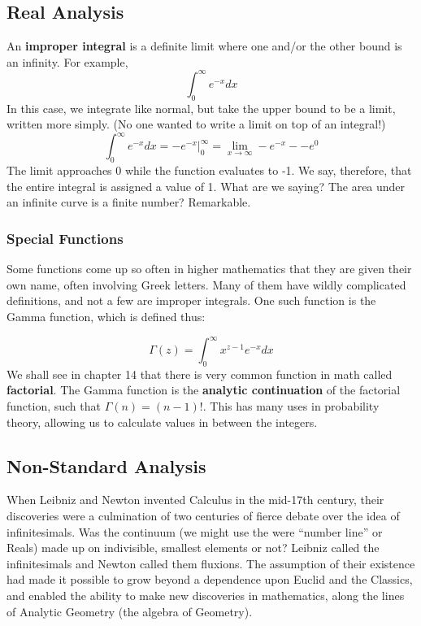 
\subsection{Real Analysis}



An \textbf{improper integral} is a definite limit where one and/or the other bound is
an infinity.  For example, 
$$
\int_0^\infty e^{-x}dx
$$
In this case, we integrate like normal, but take the upper bound to be a limit, 
written more simply.  (No one wanted to write a limit on top of an integral!)  
$$
\int_0^\infty e^{-x}dx = \left.-e^{-x}\right|_0^\infty = \lim_{x\rightarrow\infty} -e^{-x} - -e^0
$$
The limit approaches 0 while the function evaluates to -1.  We say, therefore, that
the entire integral is assigned a value of 1.  What are we saying?  The area under
an infinite curve is a finite number?  Remarkable.

\subsubsection{Special Functions}
Some functions come up so often in higher mathematics that they are given
their own name, often involving Greek letters.  Many of them have wildly 
complicated definitions, and not a few are improper integrals.  One such
function is the Gamma function, which is defined thus:

$$
\Gamma(z)=\int_{0}^{\infty}x^{z-1}e^{-x}dx
$$
We shall see in chapter 14 that there is very common function in math called
\textbf{factorial}.  The Gamma function is the \textbf{analytic continuation} of
the factorial function, such that $\Gamma(n) = (n-1)!$.  This has many uses in
probability theory, allowing us to calculate values in between the integers.


\subsection{Non-Standard Analysis}
When Leibniz and Newton invented Calculus in the mid-17th century, their discoveries were
a culmination of two centuries of fierce debate over the idea of infinitesimals.  Was the
continuum (we might use the were ``number line'' or Reals) made up on indivisible, smallest
elements or not?  Leibniz called the infinitesimals and Newton called them fluxions.  
The assumption of their existence had made it possible to grow beyond a dependence
upon Euclid and the Classics, and enabled the ability to make new discoveries in 
mathematics, along the lines of Analytic Geometry (the algebra of Geometry).


